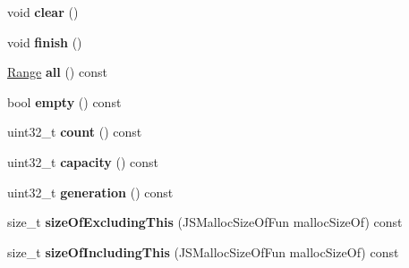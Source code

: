 \begin{DoxyCompactItemize}
\item 
\hypertarget{classjs_1_1detail_1_1_hash_table_a3b07620ba2bf328a08c2d0590f0e13ab}{void {\bfseries clear} ()}\label{classjs_1_1detail_1_1_hash_table_a3b07620ba2bf328a08c2d0590f0e13ab}

\item 
\hypertarget{classjs_1_1detail_1_1_hash_table_ac5941edbf037ba717be555ca7ede368b}{void {\bfseries finish} ()}\label{classjs_1_1detail_1_1_hash_table_ac5941edbf037ba717be555ca7ede368b}

\item 
\hypertarget{classjs_1_1detail_1_1_hash_table_a4cd666c160371c15034c8adbf58c4b8f}{\hyperlink{classjs_1_1detail_1_1_hash_table_1_1_range}{Range} {\bfseries all} () const }\label{classjs_1_1detail_1_1_hash_table_a4cd666c160371c15034c8adbf58c4b8f}

\item 
\hypertarget{classjs_1_1detail_1_1_hash_table_aa6af4caf09376d068439e51406de349e}{bool {\bfseries empty} () const }\label{classjs_1_1detail_1_1_hash_table_aa6af4caf09376d068439e51406de349e}

\item 
\hypertarget{classjs_1_1detail_1_1_hash_table_ad1615531fe85cd32773073cb6831cc4a}{uint32\-\_\-t {\bfseries count} () const }\label{classjs_1_1detail_1_1_hash_table_ad1615531fe85cd32773073cb6831cc4a}

\item 
\hypertarget{classjs_1_1detail_1_1_hash_table_ae791015941670800f625a1ec61c08c01}{uint32\-\_\-t {\bfseries capacity} () const }\label{classjs_1_1detail_1_1_hash_table_ae791015941670800f625a1ec61c08c01}

\item 
\hypertarget{classjs_1_1detail_1_1_hash_table_a86ac700b64c261b64bd2c1bfa35c332a}{uint32\-\_\-t {\bfseries generation} () const }\label{classjs_1_1detail_1_1_hash_table_a86ac700b64c261b64bd2c1bfa35c332a}

\item 
\hypertarget{classjs_1_1detail_1_1_hash_table_a02ff96593ecb2bab55f2e92ff6690f52}{size\-\_\-t {\bfseries size\-Of\-Excluding\-This} (J\-S\-Malloc\-Size\-Of\-Fun malloc\-Size\-Of) const }\label{classjs_1_1detail_1_1_hash_table_a02ff96593ecb2bab55f2e92ff6690f52}

\item 
\hypertarget{classjs_1_1detail_1_1_hash_table_a060964c6da2da4a14c1b2e7ebb90d3dc}{size\-\_\-t {\bfseries size\-Of\-Including\-This} (J\-S\-Malloc\-Size\-Of\-Fun malloc\-Size\-Of) const }\label{classjs_1_1detail_1_1_hash_table_a060964c6da2da4a14c1b2e7ebb90d3dc}


\end{DoxyCompactItemize}

